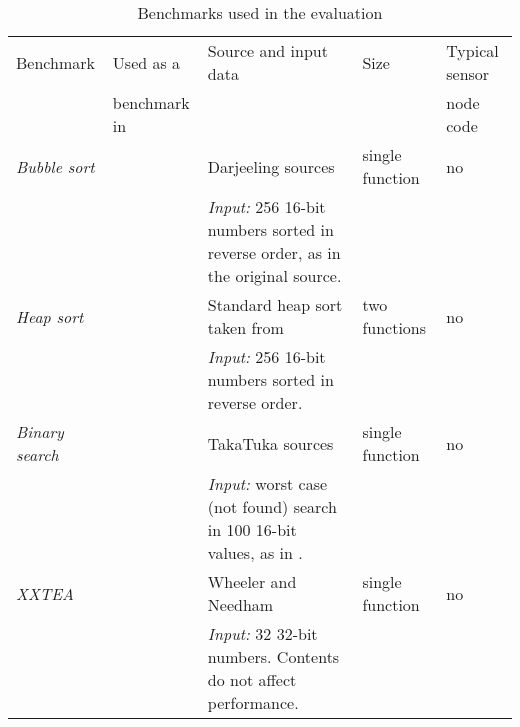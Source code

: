 \begin{table}
\caption{Benchmarks used in the evaluation}
\label{tbl-benchmarks}
    \begin{tabular}{llp{}ll}
    \toprule
    Benchmark                & Used as a                                & Source and input data                                                                                      & Size             & Typical sensor \\
                             & benchmark in                             &                                                                                                            &                  & node code \\
    \midrule
    \midrule
    \emph{Bubble sort}       & \cite{Brouwers:2009cj, Ellul:2012thesis} & Darjeeling sources                                                                                         & single function  & no \\
                             &                                          & \emph{Input:} 256 16-bit numbers sorted in reverse order, as in the original source.                       &                  & \\

    \emph{Heap sort}         &                                          & Standard heap sort taken from \cite{heapsort}                                                              & two functions    & no \\
                             &                                          & \emph{Input:} 256 16-bit numbers sorted in reverse order.                                                  &                  & \\

    \emph{Binary search}     & \cite{Ellul:2012thesis}                  & TakaTuka \cite{Aslam:2008} sources                                                                         & single function  & no \\
                             &                                          & \emph{Input:} worst case (not found) search in 100 16-bit values, as in \cite{Ellul:2012thesis}.           &                  & \\

    \emph{XXTEA}             &                                          & Wheeler and Needham \cite{Wheeler:1998}                                                                    & single function  & no \\
                             &                                          & \emph{Input:} 32 32-bit numbers. Contents do not affect performance.                                       &                  & \\


\end{tabular}
\end{table}
